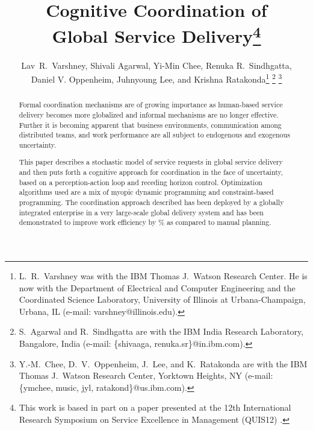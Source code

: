 \documentclass[10pt,journal,cspaper,compsoc]{IEEEtran}
\begin{document}
\title{Cognitive Coordination of \\Global Service Delivery\thanks{
  This work is based in part on a paper presented at the 12th International Research Symposium on Service Excellence in 
  Management (QUIS12) \cite{VarshneyO2011}.}
}

\author{Lav~R.~Varshney, Shivali Agarwal, Yi-Min Chee, Renuka R.~Sindhgatta, \\Daniel V. Oppenheim, Juhnyoung Lee, and Krishna Ratakonda\thanks{L.~R.~Varshney was with the IBM Thomas J.\ Watson Research Center.  He is now with the Department of Electrical and Computer Engineering and the Coordinated Science Laboratory, University of Illinois at Urbana-Champaign, Urbana, IL (e-mail: varshney@illinois.edu).}
\thanks{S.~Agarwal and R.~Sindhgatta are with the IBM India Research Laboratory, Bangalore, India (e-mail: \{shivaaga, renuka.sr\}@in.ibm.com).}
\thanks{Y.-M.~Chee, D.~V.~Oppenheim, J.~Lee, and K.~Ratakonda are with the IBM Thomas J.\ Watson Research Center, Yorktown Heights, NY (e-mail: \{ymchee, music, jyl, ratakond\}@us.ibm.com).}
}

\maketitle
\thispagestyle{empty}
\pagestyle{empty}

\begin{abstract}
Formal coordination mechanisms are of growing importance as human-based service delivery becomes more globalized and informal 
mechanisms are no longer effective. Further it is becoming apparent that business environments, communication 
among distributed teams, and work performance are all subject to endogenous and exogenous uncertainty.

This paper describes a stochastic model of service requests in global service delivery and then puts forth a cognitive
approach for coordination in the face of uncertainty, based on a perception-action loop and receding horizon control.
Optimization algorithms used are a mix of myopic dynamic programming and constraint-based programming.
The coordination approach described has been deployed by a globally integrated enterprise in a very large-scale 
global delivery system and has been demonstrated to improve work efficiency by \% as compared to manual 
planning.
\end{abstract}
\end{document}
